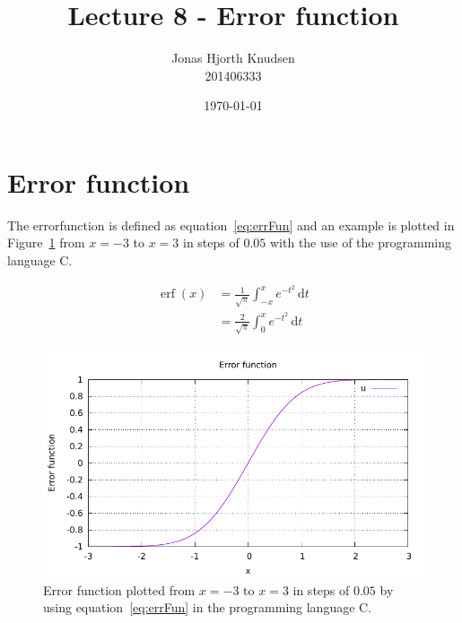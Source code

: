 \documentclass[onecolumn,a4paper,10pt]{article}
\begin{document}
\title{Lecture 8 - Error function}
\author{Jonas Hjorth Knudsen\\ 201406333}
\date{\today}

\maketitle

\section{Error function}

The errorfunction is defined as equation~\eqref{eq:errFun} and an example is plotted in Figure~\ref{fig:errFun} from $x = -3$ to $x = 3$ in steps of $0.05$ with the use of the programming language C.

\begin{align}
	\operatorname{erf}(x) &= \frac{1}{\sqrt{\pi}} \int_{-x}^{x} \! e^{-t^2} \, \mathrm{d}t \nonumber \\
	       &= \frac{2}{\sqrt{\pi}} \int_0^{x} \! e^{-t^2} \, \mathrm{d}t \label{eq:errFun}
\end{align}


\begin{figure}[!htbp]
	\centering
	\includegraphics{plotErrorFun.pdf}
	\caption{Error function plotted from $x = -3$ to $x = 3$ in steps of $0.05$ by using equation~\eqref{eq:errFun} in the programming language C.}
	\label{fig:errFun}
\end{figure}
\end{document}
